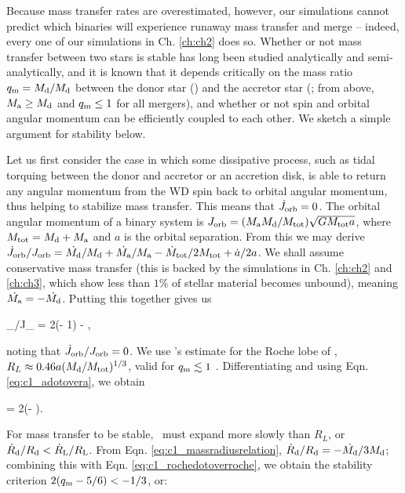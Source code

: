 Because mass transfer rates are overestimated, however, our simulations cannot predict which binaries will experience runaway mass transfer and merge -- indeed, every one of our simulations in Ch. \ref{ch:ch2} does so.  Whether or not mass transfer between two stars is stable has long been studied analytically and semi-analytically, and it is known that it depends critically on the mass ratio $\qm = \Md/\Md$ between the donor star (\Md) and the accretor star (\Ma; from above, $\Ma \geq \Md$ and $\qm \leq 1$ for all mergers), and whether or not spin and orbital angular momentum can be efficiently coupled to each other.  We sketch a simple argument for stability below.

Let us first consider the case in which some dissipative process, such as tidal torquing between the donor and accretor or an accretion disk, is able to return any angular momentum from the WD spin back to orbital angular momentum, thus helping to stabilize mass transfer.  This means that $\dot{J}_\mathrm{orb} = 0$.  The orbital angular momentum of a binary system is $J_\mrm{orb} = (\Ma\Md/\Mtot)\sqrt{G\Mtot a}$, where $\Mtot = \Md + \Ma$ and $a$ is the orbital separation.  From this we may derive $\dot{J}_\mrm{orb}/J_\mrm{orb} = \dot{\Md}/\Md + \dot{\Ma}/\Ma - \dot{M}_\mrm{tot}/2\Mtot + \dot{a}/2a$.  We shall assume conservative mass transfer (this is backed by the simulations in Ch. \ref{ch:ch2} and \ref{ch:ch3}, which show less than $1$\% of stellar material becomes unbound), meaning $\dot{\Ma} = -\dot{\Md}$.  Putting this together gives us

\eqbegin
{}_/J_ = 2(\qm- 1)\frac{\dot{\Md}}{\Md} - ,
\label{eq:c1_adotovera}
\eqend

\noindent noting that $\dot{J}_\mathrm{orb}/J_\mathrm{orb} = 0$.  We use \cite{pacz71}'s estimate for the Roche lobe of \Md, $R_L \approx 0.46a(\Md/\Mtot)^{1/3}$, valid for $\qm \lesssim 1$ \citep{eggl83}.  Differentiating and using Eqn. \ref{eq:c1_adotovera}, we obtain

\eqbegin
{} = 2(\qm- )\frac{\dot{\Md}}{\Md}.
\label{eq:c1_rochedotoverroche}
\eqend

\noindent For mass transfer to be stable, \Rd\ must expand more slowly than $R_L$, or $\dot{R}_\mrm{d}/\Rd < \dot{R}_\mrm{L}/R_\mrm{L}$.  From Eqn. \ref{eq:c1_massradiusrelation}, $\dot{R}_\mrm{d}/\Rd = -\dot{\Md}/3\Md$; combining this with Eqn. \ref{eq:c1_rochedotoverroche}, we obtain the stability criterion $2(\qm- 5/6) < -1/3$, or:

